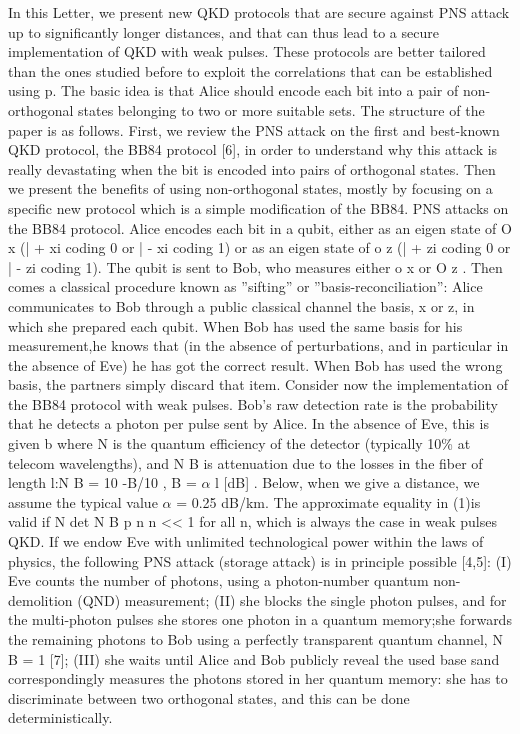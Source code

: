 In this Letter, we present new QKD protocols that are secure against PNS attack up to significantly longer distances, and that can thus lead to a secure implementation of QKD with weak pulses. These protocols are better tailored than the ones studied before to exploit the correlations that can be established using p. The basic idea is that Alice should encode each bit into a pair of non-orthogonal states belonging to two or more suitable sets.
The structure of the paper is as follows. First, we review the PNS attack on the first and best-known QKD protocol, the BB84 protocol [6], in order to understand why this attack is really devastating when the bit is encoded into pairs of orthogonal states. Then we present the benefits of using non-orthogonal states, mostly by focusing on a specific new protocol which is a simple modification of the BB84.
PNS attacks on the BB84 protocol. Alice encodes each bit in a qubit, either as an eigen state of O x (| + xi coding
0 or | - xi coding 1) or as an eigen state of o z (| + zi coding 0 or | - zi coding 1). The qubit is sent to Bob, who measures either o x or O z . Then comes a classical procedure known as ”sifting” or ”basis-reconciliation”: Alice communicates to Bob through a public classical channel the basis, x or z, in which she prepared each qubit.
When Bob has used the same basis for his measurement,he knows that (in the absence of perturbations, and in particular in the absence of Eve) he has got the correct result. When Bob has used the wrong basis, the partners simply discard that item.
Consider now the implementation of the BB84 protocol with weak pulses. Bob’s raw detection rate is the probability that he detects a photon per pulse sent by Alice. In the absence of Eve, this is given b where N is the quantum efficiency of the detector (typically 10\% at telecom wavelengths), and N B is attenuation due to the losses in the fiber of length l:N B = 10 -B/10 , B = $\alpha$ l [dB] . Below, when we give a distance, we assume the typical value $\alpha$ = 0.25 dB/km. The approximate equality in (1)is valid if N det N B p n n << 1 for all n, which is always the case in weak pulses QKD.
If we endow Eve with unlimited technological power within the laws of physics, the following PNS attack (storage attack) is in principle possible [4,5]: (I) Eve counts the number of photons, using a photon-number quantum non-demolition (QND) measurement; (II) she blocks the single photon pulses, and for the multi-photon pulses she stores one photon in a quantum memory;she forwards the remaining photons to Bob using a perfectly transparent quantum channel, N B = 1 [7]; (III) she waits until Alice and Bob publicly reveal the used base sand correspondingly measures the photons stored in her quantum memory: she has to discriminate between two orthogonal states, and this can be done deterministically.

